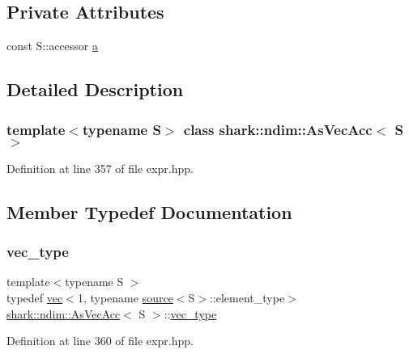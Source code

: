 \subsection*{Private Attributes}
\begin{DoxyCompactItemize}
\item 
const S\+::accessor \hyperlink{classshark_1_1ndim_1_1_as_vec_acc_3_01_s_01_4_a9145bd6eafb611f2d6fd285fe5e99f98}{a}
\end{DoxyCompactItemize}


\subsection{Detailed Description}
\subsubsection*{template$<$typename S$>$\newline
class shark\+::ndim\+::\+As\+Vec\+Acc$<$ S $>$}



Definition at line 357 of file expr.\+hpp.



\subsection{Member Typedef Documentation}
\hypertarget{classshark_1_1ndim_1_1_as_vec_acc_3_01_s_01_4_af7ad5a410cbc56cbfe74caea237b9e07}{}\label{classshark_1_1ndim_1_1_as_vec_acc_3_01_s_01_4_af7ad5a410cbc56cbfe74caea237b9e07} 
\subsubsection{\texorpdfstring{vec\+\_\+type}{vec\_type}}
{\footnotesize\ttfamily template$<$typename S $>$ \\
typedef \hyperlink{structshark_1_1ndim_1_1vec}{vec}$<$1, typename \hyperlink{structshark_1_1ndim_1_1source}{source}$<$S$>$\+::element\+\_\+type$>$ \hyperlink{classshark_1_1ndim_1_1_as_vec_acc}{shark\+::ndim\+::\+As\+Vec\+Acc}$<$ S $>$\+::\hyperlink{classshark_1_1ndim_1_1_as_vec_acc_3_01_s_01_4_af7ad5a410cbc56cbfe74caea237b9e07}{vec\+\_\+type}}



Definition at line 360 of file expr.\+hpp.



